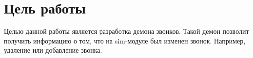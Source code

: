 \section{Цель работы}
Целью данной работы является разработка демона звонков. Такой демон позволит получить информацию о том, что на sim-модуле был изменен звонок. Например, удаление или добавление звонка. 
